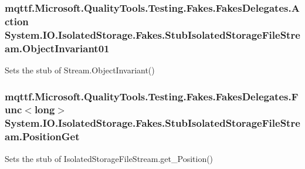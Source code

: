 \hypertarget{class_system_1_1_i_o_1_1_isolated_storage_1_1_fakes_1_1_stub_isolated_storage_file_stream_a17f6214bffaaad95d2309e2191e38961}{
\subsubsection[{Object\-Invariant01}]{\setlength{\rightskip}{0pt plus 5cm}mqttf.\-Microsoft.\-Quality\-Tools.\-Testing.\-Fakes.\-Fakes\-Delegates.\-Action System.\-I\-O.\-Isolated\-Storage.\-Fakes.\-Stub\-Isolated\-Storage\-File\-Stream.\-Object\-Invariant01}}\label{class_system_1_1_i_o_1_1_isolated_storage_1_1_fakes_1_1_stub_isolated_storage_file_stream_a17f6214bffaaad95d2309e2191e38961}


Sets the stub of Stream.\-Object\-Invariant()

\hypertarget{class_system_1_1_i_o_1_1_isolated_storage_1_1_fakes_1_1_stub_isolated_storage_file_stream_abe9aede52ed8156f7c720752ae6ef462}{
\subsubsection[{Position\-Get}]{\setlength{\rightskip}{0pt plus 5cm}mqttf.\-Microsoft.\-Quality\-Tools.\-Testing.\-Fakes.\-Fakes\-Delegates.\-Func$<$long$>$ System.\-I\-O.\-Isolated\-Storage.\-Fakes.\-Stub\-Isolated\-Storage\-File\-Stream.\-Position\-Get}}\label{class_system_1_1_i_o_1_1_isolated_storage_1_1_fakes_1_1_stub_isolated_storage_file_stream_abe9aede52ed8156f7c720752ae6ef462}


Sets the stub of Isolated\-Storage\-File\-Stream.\-get\-\_\-\-Position()

